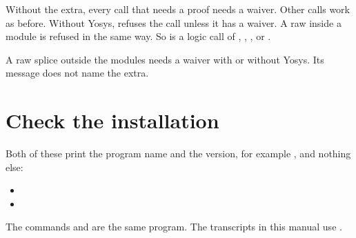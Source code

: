 Without the extra, every call that needs a proof needs a waiver. Other calls work as
before. Without Yosys,  refuses the call unless it has a waiver. A raw
 inside a module is refused in the same way. So is a logic call of
, , ,
 or .

A raw splice outside the modules needs a waiver with or
without Yosys. Its message does not name the extra.

\section{Check the installation}

Both of these print the program name and the version, for example
, and nothing else:

\begin{itemize}
\item {}
\item {}
\end{itemize}

The commands  and  are the same program. The
transcripts in this manual use .
